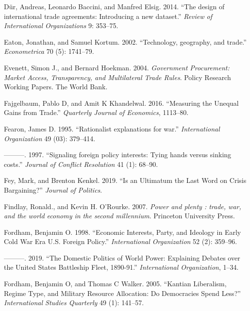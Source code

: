 \documentclass{puthesis}
\newlength{\cslhangindent}
\newenvironment{cslreferences}%
  {\setlength{\parindent}{0pt}%
  \everypar{\setlength{\hangindent}{\cslhangindent}}\ignorespaces}%
  {\par}
\begin{document}
\begin{cslreferences}
\leavevmode\hypertarget{ref-Dur2014}{}%
Dür, Andreas, Leonardo Baccini, and Manfred Elsig. 2014. ``The design of
international trade agreements: Introducing a new dataset.''
\emph{Review of International Organizations} 9: 353--75.

\leavevmode\hypertarget{ref-Eaton2002}{}%
Eaton, Jonathan, and Samuel Kortum. 2002. ``Technology, geography, and
trade.'' \emph{Econometrica} 70 (5): 1741--79.

\leavevmode\hypertarget{ref-Evenett2004}{}%
Evenett, Simon J., and Bernard Hoekman. 2004. \emph{Government
Procurement: Market Access, Transparency, and Multilateral Trade Rules}.
Policy Research Working Papers. The World Bank.

\leavevmode\hypertarget{ref-Fajgelbaum2016}{}%
Fajgelbaum, Pablo D, and Amit K Khandelwal. 2016. ``Measuring the
Unequal Gains from Trade.'' \emph{Quarterly Journal of Economics},
1113--80.

\leavevmode\hypertarget{ref-Fearon1995}{}%
Fearon, James D. 1995. ``Rationalist explanations for war.''
\emph{International Organization} 49 (03): 379--414.

\leavevmode\hypertarget{ref-Fearon1997}{}%
---------. 1997. ``Signaling foreign policy interests: Tying hands
versus sinking costs.'' \emph{Journal of Conflict Resolution} 41 (1):
68--90.

\leavevmode\hypertarget{ref-Fey2019}{}%
Fey, Mark, and Brenton Kenkel. 2019. ``Is an Ultimatum the Last Word on
Crisis Bargaining?'' \emph{Journal of Politics}.

\leavevmode\hypertarget{ref-Findlay2007}{}%
Findlay, Ronald., and Kevin H. O'Rourke. 2007. \emph{Power and plenty :
trade, war, and the world economy in the second millennium}. Princeton
University Press.

\leavevmode\hypertarget{ref-Fordham1998}{}%
Fordham, Benjamin O. 1998. ``Economic Interests, Party, and Ideology in
Early Cold War Era U.S. Foreign Policy.'' \emph{International
Organization} 52 (2): 359--96.

\leavevmode\hypertarget{ref-Fordham2019}{}%
---------. 2019. ``The Domestic Politics of World Power: Explaining
Debates over the United States Battleship Fleet, 1890-91.''
\emph{International Organization}, 1--34.

\leavevmode\hypertarget{ref-Fordham2005}{}%
Fordham, Benjamin O, and Thomas C Walker. 2005. ``Kantian Liberalism,
Regime Type, and Military Resource Allocation: Do Democracies Spend
Less?'' \emph{International Studies Quarterly} 49 (1): 141--57.


\end{cslreferences}
\end{document}
